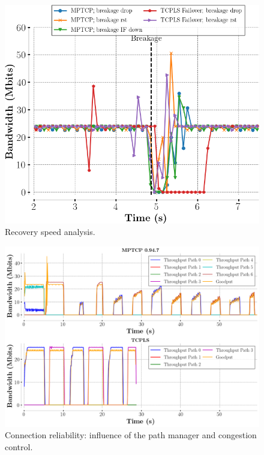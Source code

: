 \begin{figure}[!t]
  \begin{center}
    \includegraphics[width=\columnwidth]{figures/breakage_analysis.png}
  \end{center}
  \caption{Recovery speed analysis.}
\end{figure}


\begin{figure}[!t]
  \begin{center}
    \includegraphics[width=\columnwidth]{figures/tcpls_mptcp.png}
  \end{center}
  \caption{Connection reliability: influence of the path manager and congestion
  control.}
\end{figure}



